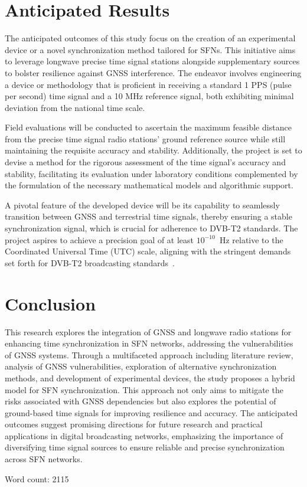 \documentclass[conference]{IEEEtran}
\begin{document}
\section{Anticipated Results}

The anticipated outcomes of this study focus on the creation of an experimental
device or a novel synchronization method tailored for SFNs. This initiative aims to leverage longwave precise time signal stations
alongside supplementary sources to bolster resilience against GNSS
interference. The endeavor involves engineering a device or methodology that is
proficient in receiving a standard 1 PPS (pulse per second) time signal and a
10 MHz reference signal, both exhibiting minimal deviation from the national
time scale.

Field evaluations will be conducted to ascertain the maximum feasible distance
from the precise time signal radio stations' ground reference source while
still maintaining the requisite accuracy and stability. Additionally, the
project is set to devise a method for the rigorous assessment of the time
signal's accuracy and stability, facilitating its evaluation under laboratory
conditions complemented by the formulation of the necessary mathematical models
and algorithmic support.

A pivotal feature of the developed device will be its capability to seamlessly
transition between GNSS and terrestrial time signals, thereby ensuring a stable
synchronization signal, which is crucial for adherence to DVB-T2 standards. The
project aspires to achieve a precision goal of at least $10^{-10}$~Hz relative
to the Coordinated Universal Time (UTC) scale, aligning with the stringent
demands set forth for DVB-T2 broadcasting standards~\cite{Hellstrom2007}.

\section{Conclusion}

This research explores the integration of GNSS and longwave radio stations for
enhancing time synchronization in SFN networks, addressing the vulnerabilities
of GNSS systems. Through a multifaceted approach including literature review,
analysis of GNSS vulnerabilities, exploration of alternative synchronization
methods, and development of experimental devices, the study proposes a hybrid
model for SFN synchronization. This approach not only aims to mitigate the
risks associated with GNSS dependencies but also explores the potential of
ground-based time signals for improving resilience and accuracy. The
anticipated outcomes suggest promising directions for future research and
practical applications in digital broadcasting networks, emphasizing the
importance of diversifying time signal sources to ensure reliable and precise
synchronization across SFN networks.

\printbibliography

Word count: 2115
\end{document}
